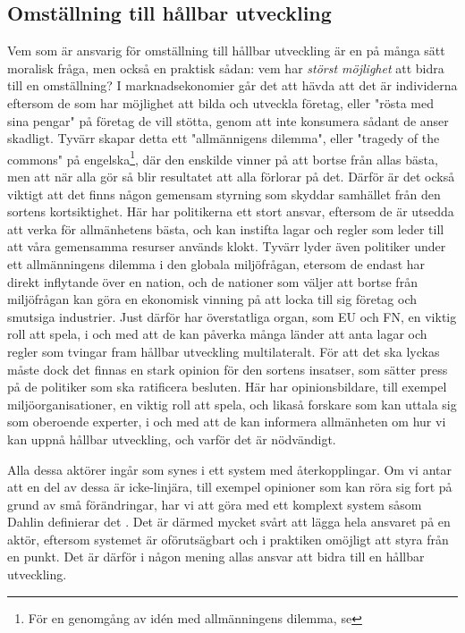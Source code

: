\documentclass{article}
\begin{document}
\subsection{Omställning till hållbar utveckling}
Vem som är ansvarig för omställning till hållbar utveckling är en på många sätt moralisk fråga, men också en praktisk sådan: vem har \emph{störst möjlighet} att bidra till en omställning? I marknadsekonomier går det att hävda att det är individerna eftersom de som har möjlighet att bilda och utveckla företag, eller "rösta med sina pengar" på företag de vill stötta, genom att inte konsumera sådant de anser skadligt. Tyvärr skapar detta ett "allmännigens dilemma", eller "tragedy of the commons" på engelska\footnote{För en genomgång av idén med allmänningens dilemma, se }, där den enskilde vinner på att bortse från allas bästa, men att när alla gör så blir resultatet att alla förlorar på det. Därför är det också viktigt att det finns någon gemensam styrning som skyddar samhället från den sortens kortsiktighet. Här har politikerna ett stort ansvar, eftersom de är utsedda att verka för allmänhetens bästa, och kan instifta lagar och regler som leder till att våra gemensamma resurser används klokt. Tyvärr lyder även politiker under ett allmänningens dilemma i den globala miljöfrågan, etersom de endast har direkt inflytande över en nation, och de nationer som väljer att bortse från miljöfrågan kan göra en ekonomisk vinning på att locka till sig företag och smutsiga industrier. Just därför har överstatliga organ, som EU och FN, en viktig roll att spela, i och med att de kan påverka många länder att anta lagar och regler som tvingar fram hållbar utveckling multilateralt. För att det ska lyckas måste dock det finnas en stark opinion för den sortens insatser, som sätter press på de politiker som ska ratificera besluten. Här har opinionsbildare, till exempel miljöorganisationer, en viktig roll att spela, och likaså forskare som kan uttala sig som oberoende experter, i och med att de kan informera allmänheten om hur vi kan uppnå hållbar utveckling, och varför det är nödvändigt.

Alla dessa aktörer ingår som synes i ett system med återkopplingar. Om vi antar att en del av dessa är icke-linjära, till exempel opinioner som kan röra sig fort på grund av små förändringar, har vi att göra med ett komplext system såsom Dahlin definierar det . Det är därmed mycket svårt att lägga hela ansvaret på en aktör, eftersom systemet är oförutsägbart och i praktiken omöjligt att styra från en punkt. Det är därför i någon mening allas ansvar att bidra till en hållbar utveckling.

\end{document}
